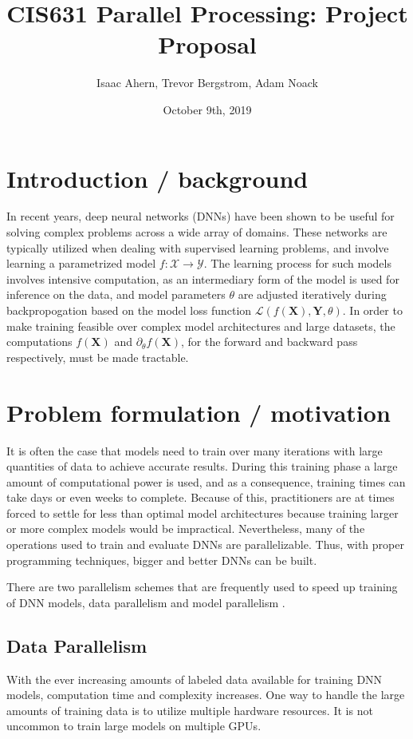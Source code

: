 \documentclass{article}
\title{CIS631 Parallel Processing: Project Proposal}
\author{Isaac Ahern, Trevor Bergstrom, Adam Noack}
\date{October 9th, 2019}
\newcommand{\X}{\mathbf{X}}
\newcommand{\Y}{\mathbf{Y}}
\begin{document}
\maketitle

\section{Introduction / background}
In recent years, deep neural networks (DNNs) have been shown to be useful for solving complex problems across a wide array of domains. These networks are typically utilized when dealing with supervised learning problems, and involve learning a parametrized model $f: \mathcal{X} \to \mathcal{Y}$. The learning process for such models involves intensive computation, as an intermediary form of the model is used for inference on the data, and model parameters $\theta$ are adjusted iteratively during backpropogation based on the model loss function $\mathcal{L}(f(\X), \Y,\theta)$. In order to make training feasible over complex model architectures and large datasets, the computations $f(\X)$ and $\partial_\theta f (\X)$, for the forward and backward pass respectively, must be made tractable.


\section{Problem formulation / motivation}
It is often the case that models need to train over many iterations with large quantities of data to achieve accurate results. During this training phase a large amount of computational power is used, and as a consequence, training times can take days or even weeks to complete. Because of this, practitioners are at times forced to settle for less than optimal model architectures because training larger or more complex models would be impractical.
%
Nevertheless, many of the operations used to train and evaluate DNNs are parallelizable. Thus, with proper programming techniques, bigger and better DNNs can be built.

There are two parallelism schemes that are frequently used to speed up training of DNN models, data parallelism and model parallelism \cite{parall_dl_survey}.


\subsection{Data Parallelism}
With the ever increasing amounts of labeled data available for training DNN models, computation time and complexity increases. One way to handle the large amounts of training data is to utilize multiple hardware resources. It is not uncommon to train large models on multiple GPUs.
\end{document}
